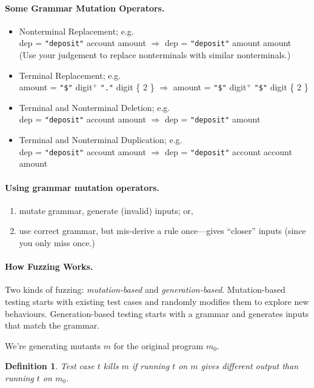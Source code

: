 \documentclass[11pt]{article}
\newtheorem{defn}{Definition}
\begin{document}
\paragraph{Some Grammar Mutation Operators.} 
\begin{itemize}
\item Nonterminal Replacement; e.g. \\
{\sf dep = {\tt "deposit"} account amount $\Longrightarrow$
 dep = {\tt "deposit"} amount amount}
(Use your judgement to replace nonterminals with similar nonterminals.)

\item Terminal Replacement; e.g. \\
{\sf amount = {\tt "\$"} digit$^+$ {\tt "."} digit \{ 2 \} 
$\Longrightarrow$ amount = {\tt "\$"} digit$^+$ {\tt "\$"} digit \{ 2 \} }

\item Terminal and Nonterminal Deletion; e.g.\\
{\sf dep = {\tt "deposit"} account amount $\Longrightarrow$
 dep = {\tt "deposit"} amount}

\item Terminal and Nonterminal Duplication; e.g.\\
{\sf dep = {\tt "deposit"} account amount $\Longrightarrow$
 dep = {\tt "deposit"} account account amount}
\end{itemize}

\paragraph{Using grammar mutation operators.}
\begin{enumerate}[noitemsep]
\item mutate grammar, generate (invalid) inputs; or,
\item use correct grammar, but mis-derive a rule once---gives ``closer''
inputs (since you only miss once.)
\end{enumerate}

\paragraph{How Fuzzing Works.} 
Two kinds of fuzzing: \emph{mutation-based} and
\emph{generation-based}. Mutation-based testing starts with
existing test cases and randomly modifies them to explore new behaviours.
Generation-based testing starts with a grammar and generates
inputs that match the grammar.

We're generating mutants $m$ for the original program $m_0$.
\begin{defn}
Test case $t$ \emph{kills} $m$ if running $t$ on $m$ gives different 
output than running $t$ on $m_0$.
\end{defn}
\end{document}
